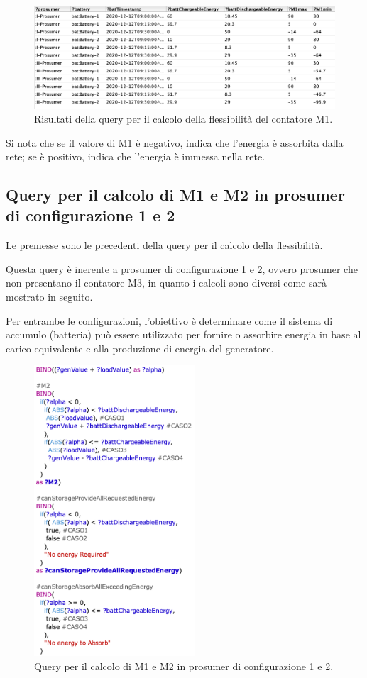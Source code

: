 \begin{figure}[H]
    \centering
    \includegraphics[width=15cm]{images/query_flessibilita_res.png}
    \caption{Risultati della query per il calcolo della flessibilità del contatore M1.}
    \label{fig:query_flessibilita_res}
\end{figure}

Si nota che se il valore di M1 è negativo, indica che l'energia è assorbita dalla rete; se è positivo, indica che l'energia è immessa nella rete.

\subsection{Query per il calcolo di M1 e M2 in prosumer di configurazione 1 e 2}

Le premesse sono le precedenti della query per il calcolo della flessibilità.

Questa query è inerente a prosumer di configurazione 1 e 2, ovvero prosumer che non presentano il contatore M3, in quanto i calcoli sono diversi come sarà mostrato in seguito.

Per entrambe le configurazioni, l'obiettivo è determinare come il sistema di accumulo (batteria) può essere utilizzato per fornire o assorbire energia
in base al carico equivalente e alla produzione di energia del generatore.

\begin{figure}[H]
    \centering
    \includegraphics[width=6cm]{images/query_m1m2_config0102.png}
    \caption{Query per il calcolo di M1 e M2 in prosumer di configurazione 1 e 2.}
    \label{fig:query_m1_m2}
\end{figure}

